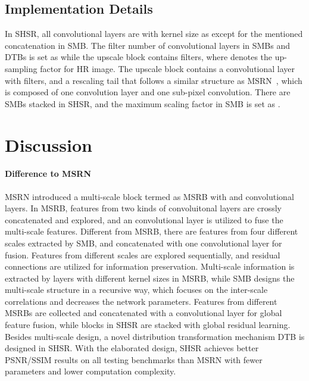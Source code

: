 \documentclass[manuscript,screen]{acmart}
\begin{document}
\subsection{Implementation Details}
In SHSR, all convolutional layers are with kernel size as  except for the mentioned  concatenation in SMB. The filter number of convolutional layers in SMBs and DTBs is set as  while the upscale block contains  filters, where  denotes the up-sampling factor for HR image. The upscale block contains a convolutional layer with  filters, and a rescaling tail that follows a similar structure as MSRN~\cite{msrn_eccv2018}, which is composed of one convolution layer and one sub-pixel convolution. There are  SMBs stacked in SHSR, and the maximum scaling factor in SMB is set as .

\section{Discussion}
\paragraph{Difference to MSRN~\cite{msrn_eccv2018}}
MSRN introduced a multi-scale block termed as MSRB with  and  convolutional layers. In MSRB, features from two kinds of convoluitonal layers are crossly concatenated and explored, and an  convolutional layer is utilized to fuse the multi-scale features.
Different from MSRB, there are features from four different scales extracted by SMB, and concatenated with one convolutional layer for fusion. Features from different scales are explored sequentially, and residual connections are utilized for information preservation.
Multi-scale information is extracted by layers with different kernel sizes in MSRB, while SMB designs the multi-scale structure in a recursive way, which focuses on the inter-scale correlations and decreases the network parameters.
Features from different MSRBs are collected and concatenated with a convolutional layer for global feature fusion, while blocks in SHSR are stacked with global residual learning.
Besides multi-scale design, a novel distribution transformation mechanism DTB is designed in SHSR. With the elaborated design, SHSR achieves better PSNR/SSIM results on all testing benchmarks than MSRN with fewer parameters and lower computation complexity.
\end{document}

